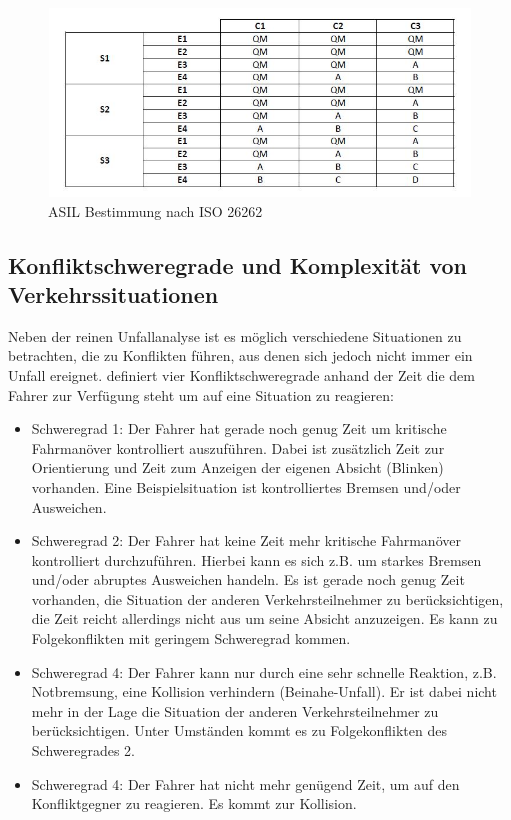 \begin{savenotes}
	\begin{figure}[H]
		\centering
		\includegraphics[width=12cm,height=5cm]{figures/ISO_26262}
		\caption[ASIL Bestimmung nach ISO 26262]{ASIL Bestimmung nach ISO 26262 \parencite[S. 96]{Hillenbrand.2012}}\label{fig:ISO 26262}
	\end{figure}
\end{savenotes}

\subsection{Konfliktschweregrade und Komplexität von Verkehrssituationen}
Neben der reinen Unfallanalyse ist es möglich verschiedene Situationen zu betrachten, die zu Konflikten führen, aus denen sich jedoch nicht immer ein Unfall ereignet. \Textcite[S. 28]{Erke.1978} definiert vier Konfliktschweregrade anhand der Zeit die dem Fahrer zur Verfügung steht um auf eine Situation zu reagieren:

\begin{itemize}
	\item Schweregrad 1: Der Fahrer hat gerade noch genug Zeit um kritische Fahrmanöver kontrolliert auszuführen. Dabei ist zusätzlich Zeit zur Orientierung und Zeit zum Anzeigen der eigenen Absicht (Blinken) vorhanden. Eine Beispielsituation ist kontrolliertes Bremsen und/oder Ausweichen.
	\item Schweregrad 2: Der Fahrer hat keine Zeit mehr kritische Fahrmanöver kontrolliert durchzuführen. Hierbei kann es sich z.B. um starkes Bremsen und/oder abruptes Ausweichen handeln. Es ist gerade noch genug Zeit vorhanden, die Situation der anderen Verkehrsteilnehmer zu berücksichtigen, die Zeit reicht allerdings nicht aus um seine Absicht anzuzeigen. Es kann zu Folgekonflikten mit geringem Schweregrad kommen.
	\item Schweregrad 4: Der Fahrer kann nur durch eine sehr schnelle Reaktion, z.B. Notbremsung, eine Kollision verhindern (Beinahe-Unfall). Er ist dabei nicht mehr in der Lage die Situation der anderen Verkehrsteilnehmer zu berücksichtigen. Unter Umständen kommt es zu Folgekonflikten des Schweregrades 2.
	\item Schweregrad 4: Der Fahrer hat nicht mehr genügend Zeit, um auf den Konfliktgegner zu reagieren. Es kommt zur Kollision.
\end{itemize}

